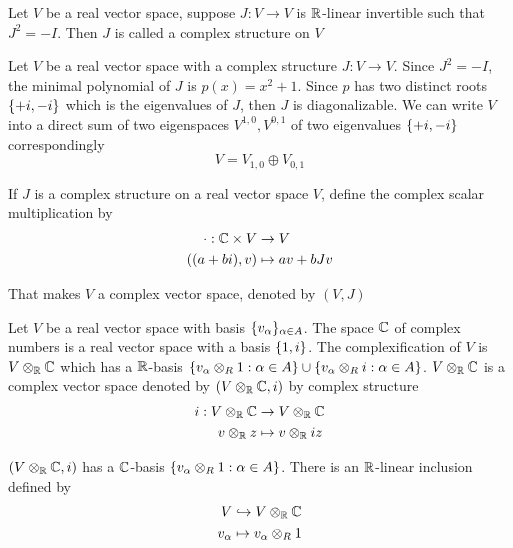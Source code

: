 \begin{definition}
	Let $V$ be a real vector space, suppose $J: V \to V$ is $\R$-linear invertible such that $J^2 = -I$. Then $J$ is called a complex structure on $V$
\end{definition}

\begin{proposition}
	Let $V$ be a real vector space with a complex structure $J: V \to V$. Since $J^2 = -I$, the minimal polynomial of $J$ is $p(x) = x^2 + 1$. Since $p$ has two distinct roots $\set{+i, -i}$ which is the eigenvalues of $J$, then $J$ is diagonalizable. We can write $V$ into a direct sum of two eigenspaces $V^{1,0}, V^{0, 1}$ of two eigenvalues $\set{+i, -i}$ correspondingly
	$$
		V = V_{1,0} \oplus V_{0, 1}
	$$
\end{proposition}

\begin{remark}
	If $J$ is a complex structure on a real vector space $V$, define the complex scalar multiplication by
	\begin{align*}
		\cdot: \C \times V &\to V \\
		((a + bi), v) &\mapsto a v + b J v
	\end{align*}
	
	That makes $V$ a complex vector space, denoted by $(V, J)$
\end{remark}

\begin{definition}[complexification]
	Let $V$ be a real vector space with basis $\set{v_\alpha}_{\alpha \in A}$. The space $\C$ of complex numbers is a real vector space with a basis $\set{1, i}$. The complexification of $V$ is $V \otimes_\R \C$ which has a $\R$-basis $\set*{v_\alpha \otimes_R 1: \alpha \in A} \cup \set*{v_\alpha \otimes_R i: \alpha \in A}$.	$V \otimes_\R \C$ is a complex vector space  denoted by $(V \otimes_\R \C, i)$ by complex structure
	\begin{align*}
		i: V \otimes_\R \C &\to V \otimes_\R \C \\
		v \otimes_\R z &\mapsto v \otimes_\R iz
	\end{align*}
	
	$(V \otimes_\R \C, i)$ has a $\C$-basis $\set*{v_\alpha \otimes_R 1: \alpha \in A}$. There is an $\R$-linear inclusion defined by
	\begin{align*}
		V &\hookrightarrow V \otimes_\R \C \\
		v_\alpha &\mapsto v_\alpha \otimes_R 1
	\end{align*}
\end{definition}

